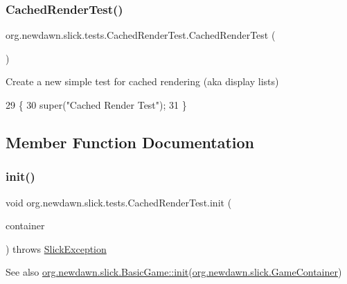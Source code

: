 \subsubsection{\texorpdfstring{Cached\+Render\+Test()}{CachedRenderTest()}}
{\footnotesize\ttfamily org.\+newdawn.\+slick.\+tests.\+Cached\+Render\+Test.\+Cached\+Render\+Test (\begin{DoxyParamCaption}{ }\end{DoxyParamCaption})\hspace{0.3cm}{\ttfamily [inline]}}

Create a new simple test for cached rendering (aka display lists) 
\begin{DoxyCode}
29                               \{
30         super(\textcolor{stringliteral}{"Cached Render Test"});
31     \}
\end{DoxyCode}


\subsection{Member Function Documentation}
\mbox{\label{classorg_1_1newdawn_1_1slick_1_1tests_1_1_cached_render_test_a03ef696801a0f0b42eb3e68cb162b154}} 
\subsubsection{\texorpdfstring{init()}{init()}}
{\footnotesize\ttfamily void org.\+newdawn.\+slick.\+tests.\+Cached\+Render\+Test.\+init (\begin{DoxyParamCaption}\item[{final \mbox{\hyperlink{classorg_1_1newdawn_1_1slick_1_1_game_container}{Game\+Container}}}]{container }\end{DoxyParamCaption}) throws \mbox{\hyperlink{classorg_1_1newdawn_1_1slick_1_1_slick_exception}{Slick\+Exception}}\hspace{0.3cm}{\ttfamily [inline]}}

\begin{DoxySeeAlso}{See also}
\mbox{\hyperlink{classorg_1_1newdawn_1_1slick_1_1_basic_game_a8af0900217e4d389249f71367b22d114}{org.\+newdawn.\+slick.\+Basic\+Game\+::init}}(\mbox{\hyperlink{classorg_1_1newdawn_1_1slick_1_1_game_container}{org.\+newdawn.\+slick.\+Game\+Container}}) 
\end{DoxySeeAlso}


